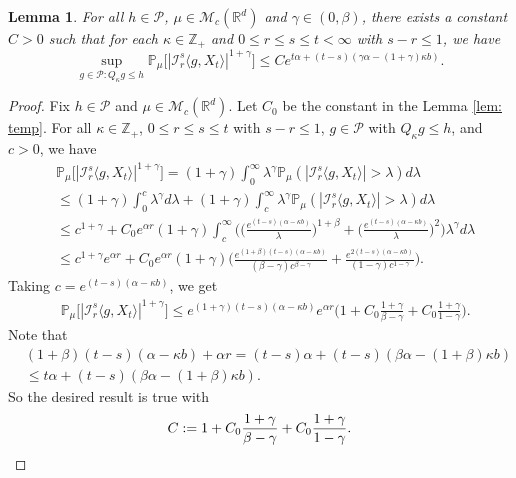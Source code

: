 \documentclass[12pt,a4paper]{amsart}
\theoremstyle{plain}
\newtheorem{lem}[thm]{Lemma}
\theoremstyle{definition}
\numberwithin{equation}{section}
\begin{document}
\begin{lem}
\label{lem: control of mgtrs}
    For all $h \in \mathcal P$, $\mu \in \mathcal M_c(\mathbb R^d)$ and $\gamma\in (0, \beta)$, there exists a constant $C > 0$ such that for each $\kappa \in \mathbb Z_+$ and $0\leq r\leq s\leq t<\infty$ with $s-r \leq 1$, we have
\[
    \sup_{g \in \mathcal P: Q_\kappa g\leq h} \mathbb P_\mu\big[|\mathcal I_r^s\langle g, X_t\rangle|^{1+\gamma}\big]
    \leq C e^{t\alpha+(t-s) (\gamma\alpha- (1+\gamma)\kappa b)}.
\]
\end{lem}

\begin{proof}
    Fix $h \in \mathcal P$ and $\mu \in \mathcal M_c(\mathbb R^d)$. Let $C_0$ be the constant in the Lemma \ref{lem: temp}.
    For all $\kappa \in \mathbb Z_+$,  $0\leq r\leq s\leq t$ with $s-r \leq 1$,  $g\in \mathcal P$ with $Q_{\kappa} g \leq h$, and $c>0$, we have
\begin{equation}\begin{split}
&\mathbb P_\mu\big[|\mathcal I_r^s\langle g, X_t\rangle|^{1+\gamma}\big]
    = (1+\gamma)\int_0^\infty \lambda^{\gamma} \mathbb P_{\mu}(|\mathcal I_r^s\langle g, X_t\rangle|>\lambda) d\lambda
    \\&\leq (1+\gamma)\int_0^c \lambda^{\gamma} d\lambda +(1+\gamma)\int_c^\infty \lambda^{\gamma}\mathbb P_\mu(|\mathcal I_r^s\langle g, X_t\rangle|> \lambda) d\lambda
    \\& \leq c^{1+\gamma} + C_0  e^{\alpha r}(1+\gamma)\int_c^\infty \bigg(\Big(\frac{e^{(t-s)(\alpha - \kappa b)}}{\lambda}\Big)^{1+\beta}+\Big(\frac{e^{(t-s)(\alpha - \kappa b)}}{\lambda}\Big)^{2}\bigg)\lambda^{\gamma}d\lambda 
    \\&\leq c^{1+\gamma} e^{\alpha r} + C_0e^{\alpha r}(1+\gamma)\Big(  \frac{e^{(1+\beta)(t-s)(\alpha- \kappa b)}}{(\beta - \gamma)c^{\beta - \gamma}}  + \frac{e^{2(t-s)(\alpha- \kappa b)}}{(1 - \gamma)c^{1 - \gamma}} \Big).
\end{split}\end{equation}
    Taking $c = e^{(t-s)(\alpha- \kappa b)}$, we get
\begin{equation}\begin{split}
    &\mathbb P_\mu\big[|\mathcal I_r^s\langle g, X_t\rangle|^{1+\gamma}\big]
    \leq e^{(1+\gamma)(t-s)(\alpha- \kappa b)} e^{\alpha r}\Big(1+ C_0 \frac{1+\gamma}{\beta - \gamma}+ C_0 \frac{1+\gamma}{1 - \gamma}\Big).
\end{split}\end{equation}
    Note that
\begin{equation}\begin{split}
    &(1+\beta)(t-s)(\alpha- \kappa b) + \alpha r
    = (t-s)\alpha+(t-s) (\beta\alpha- (1+\beta)\kappa b)
    \\&\leq t\alpha+(t-s) (\beta\alpha- (1+\beta)\kappa b).
\end{split}\end{equation}
    So the desired result is true with
\[
    C := 1+ C_0 \frac{1+\gamma}{\beta - \gamma}+ C_0 \frac{1+\gamma}{1 - \gamma}.
    \qedhere
\]
\end{proof}
\end{document}
